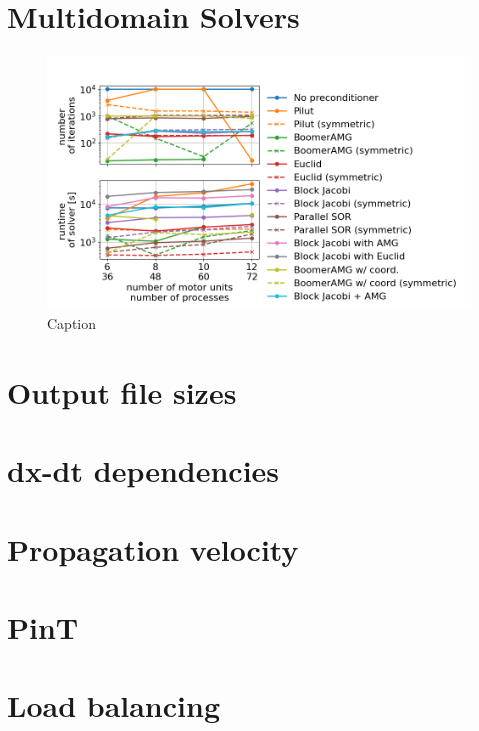 \section{Multidomain Solvers}

\begin{figure}[H]%
  \centering%
  \includegraphics[width=\textwidth]{images/results/studies/multidomain_solvers_all.png}%
  \caption{Caption}%
  \label{fig:fig1}%
\end{figure}
\section{Output file sizes}
\section{dx-dt dependencies}
\section{Propagation velocity}

\section{PinT}
\section{Load balancing}
